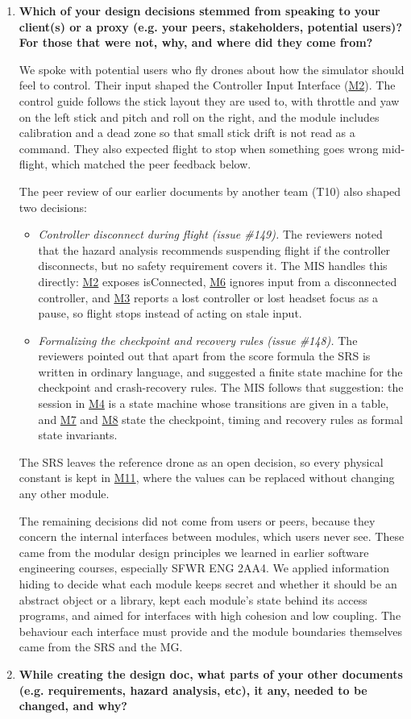 \documentclass[12pt, titlepage]{article}
\newcommand{\Mref}[1]{\hyperref[sec:M#1]{M#1}}
\begin{document}
\begin{enumerate}
  \item \textbf{Which of your design decisions stemmed from speaking to your
  client(s) or a proxy (e.g. your peers, stakeholders, potential users)? For
  those that were not, why, and where did they come from?}

  We spoke with potential users who fly drones about how the simulator should
  feel to control. Their input shaped the Controller Input Interface
  (\Mref{2}). The control guide follows the stick layout they are used to,
  with throttle and yaw on the left stick and pitch and roll on the right, and
  the module includes calibration and a dead zone so that small stick drift
  is not read as a command. They also expected flight to stop when something
  goes wrong mid-flight, which matched the peer feedback below.

  The peer review of our earlier documents by another team (T10) also shaped
  two decisions:

  \begin{itemize}
  \item \emph{Controller disconnect during flight (issue \#149).} The reviewers
    noted that the hazard analysis recommends suspending flight if the
    controller disconnects, but no safety requirement covers it. The MIS
    handles this directly: \Mref{2} exposes isConnected, \Mref{6} ignores input
    from a disconnected controller, and \Mref{3} reports a lost controller or
    lost headset focus as a pause, so flight stops instead of acting on stale
    input.
  \item \emph{Formalizing the checkpoint and recovery rules (issue \#148).} The
    reviewers pointed out that apart from the score formula the SRS is written
    in ordinary language, and suggested a finite state machine for the
    checkpoint and crash-recovery rules. The MIS follows that suggestion: the
    session in \Mref{4} is a state machine whose transitions are given in a
    table, and \Mref{7} and \Mref{8} state the checkpoint, timing and recovery
    rules as formal state invariants.
  \end{itemize}

  The SRS leaves the reference drone as an open decision, so every physical
  constant is kept in \Mref{11}, where the values can be replaced without
  changing any other module.

  The remaining decisions did not come from users or peers, because they
  concern the internal interfaces between modules, which users never see.
  These came from the modular design principles we learned in earlier
  software engineering courses, especially SFWR ENG 2AA4. We applied
  information hiding to decide what each module keeps secret and whether it
  should be an abstract object or a library, kept each module's state behind
  its access programs, and aimed for interfaces with high cohesion and low
  coupling. The behaviour each interface must provide and the module
  boundaries themselves came from the SRS and the MG.
  \item \textbf{While creating the design doc, what parts of your other
  documents (e.g. requirements, hazard analysis, etc), it any, needed to be
  changed, and why?}


\end{enumerate}
\end{document}
